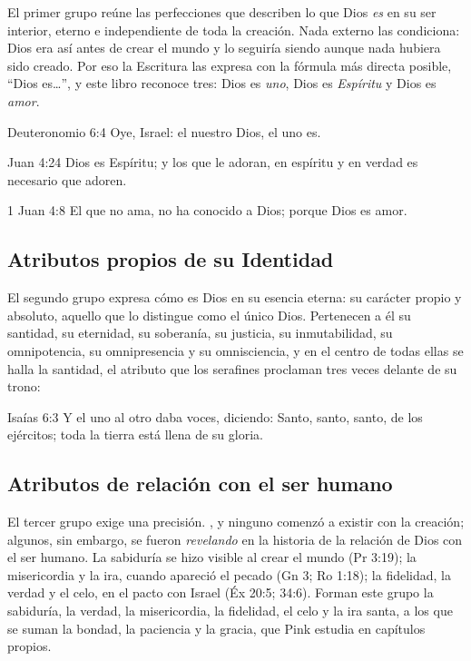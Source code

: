 El primer grupo reúne las perfecciones que describen lo que Dios \emph{es} en su ser interior, eterno e independiente de toda la creación. Nada externo las condiciona: Dios era así antes de crear el mundo y lo seguiría siendo aunque nada hubiera sido creado. Por eso la Escritura las expresa con la fórmula más directa posible, “Dios es…”, y este libro reconoce tres: Dios es \emph{uno}, Dios es \emph{Espíritu} y Dios es \emph{amor}.

\begin{verso}{Deuteronomio 6:4}
Oye, Israel: el \SENOR{} nuestro Dios, el \SENOR{} uno es.
\end{verso}

\begin{verso}{Juan 4:24}
Dios es Espíritu; y los que le adoran, en espíritu y en verdad es necesario que adoren.
\end{verso}

\begin{verso}{1 Juan 4:8}
El que no ama, no ha conocido a Dios; porque Dios es amor.
\end{verso}

\subsection{Atributos propios de su Identidad}

El segundo grupo expresa cómo es Dios en su esencia eterna: su carácter propio y absoluto, aquello que lo distingue como el único Dios. Pertenecen a él su santidad, su eternidad, su soberanía, su justicia, su inmutabilidad, su omnipotencia, su omnipresencia y su omnisciencia, y en el centro de todas ellas se halla la santidad, el atributo que los serafines proclaman tres veces delante de su trono:

\begin{verso}{Isaías 6:3}
Y el uno al otro daba voces, diciendo: Santo, santo, santo, \SENOR{} de los ejércitos; toda la tierra está llena de su gloria.
\end{verso}

\subsection{Atributos de relación con el ser humano}

El tercer grupo exige una precisión. , y ninguno comenzó a existir con la creación; algunos, sin embargo, se fueron \emph{revelando} en la historia de la relación de Dios con el ser humano. La sabiduría se hizo visible al crear el mundo (Pr 3:19); la misericordia y la ira, cuando apareció el pecado (Gn 3; Ro 1:18); la fidelidad, la verdad y el celo, en el pacto con Israel (Éx 20:5; 34:6). Forman este grupo la sabiduría, la verdad, la misericordia, la fidelidad, el celo y la ira santa, a los que se suman la bondad, la paciencia y la gracia, que Pink estudia en capítulos propios.


